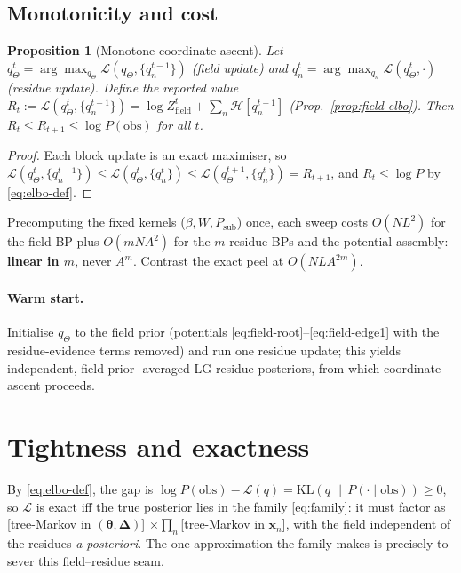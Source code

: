 \documentclass[11pt]{article}
\newtheorem{proposition}{Proposition}
\newcommand{\btheta}{\bm{\theta}}
\newcommand{\bDelta}{\bm{\Delta}}
\newcommand{\bx}{\bm{x}}
\newcommand{\KL}[2]{\mathrm{KL}\!\left(#1\,\|\,#2\right)}
\newcommand{\Ent}[1]{\mathcal{H}\!\left[#1\right]}
\newcommand{\Psub}{P_{\mathrm{sub}}}
\begin{document}
\subsection{Monotonicity and cost}

\begin{proposition}[Monotone coordinate ascent]
Let $q_\Theta^{t}=\arg\max_{q_\Theta}\mathcal L(q_\Theta,\{q_n^{t-1}\})$
(field update) and $q_n^{t}=\arg\max_{q_n}\mathcal L(q_\Theta^{t},\cdot)$
(residue update). Define the reported value
$R_t := \mathcal L(q_\Theta^{t},\{q_n^{t-1}\}) = \log Z_{\mathrm{field}}^{t}
 + \sum_n\Ent{q_n^{t-1}}$ (Prop.~\ref{prop:field-elbo}). Then
$R_t\le R_{t+1}\le\log P(\mathrm{obs})$ for all $t$.
\end{proposition}
\begin{proof}
Each block update is an exact maximiser, so
$\mathcal L(q_\Theta^{t},\{q_n^{t-1}\})\le\mathcal L(q_\Theta^{t},\{q_n^{t}\})
\le\mathcal L(q_\Theta^{t+1},\{q_n^{t}\})=R_{t+1}$, and $R_t\le\log P$ by
\eqref{eq:elbo-def}.
\end{proof}
Precomputing the fixed kernels ($\beta,W,\Psub$) once, each sweep costs
$O(N L^2)$ for the field BP plus $O(m N A^2)$ for the $m$ residue BPs and the
potential assembly: \textbf{linear in $m$}, never $A^m$. Contrast the exact
peel at $O(N L A^{2m})$.

\paragraph{Warm start.}
Initialise $q_\Theta$ to the field prior (potentials
\eqref{eq:field-root}--\eqref{eq:field-edge1} with the residue-evidence terms
removed) and run one residue update; this yields independent, field-prior-
averaged LG residue posteriors, from which coordinate ascent proceeds.

\section{Tightness and exactness}
\label{sec:tightness}

By \eqref{eq:elbo-def}, the gap is
$\log P(\mathrm{obs})-\mathcal L(q)=\KL{q}{P(\cdot\mid\mathrm{obs})}\ge0$, so
$\mathcal L$ is exact iff the true posterior lies in the family
\eqref{eq:family}: it must factor as [tree-Markov in $(\btheta,\bDelta)$]
$\times\prod_n$[tree-Markov in $\bx_n$], with the field independent of the
residues \emph{a posteriori}. The one approximation the family makes is
precisely to sever this field--residue seam.
\end{document}
